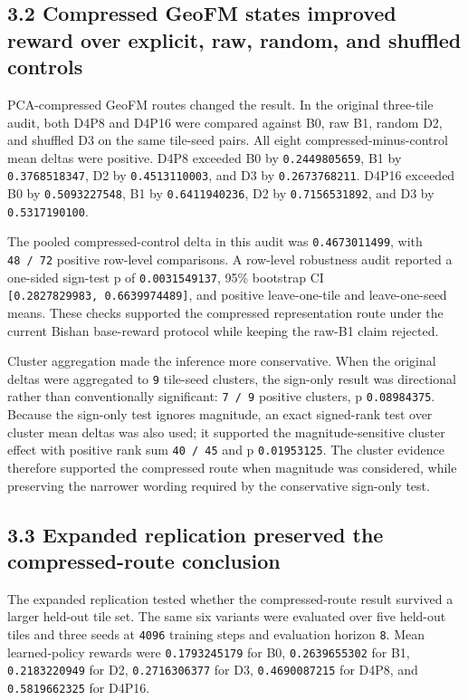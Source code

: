 \documentclass[
  11pt,
  a4paper,
]{article}
\begin{document}
\subsection{3.2 Compressed GeoFM states improved reward over explicit,
raw, random, and shuffled
controls}\label{compressed-geofm-states-improved-reward-over-explicit-raw-random-and-shuffled-controls}

PCA-compressed GeoFM routes changed the result. In the original
three-tile audit, both D4P8 and D4P16 were compared against B0, raw B1,
random D2, and shuffled D3 on the same tile-seed pairs. All eight
compressed-minus-control mean deltas were positive. D4P8 exceeded B0 by
\texttt{0.2449805659}, B1 by \texttt{0.3768518347}, D2 by
\texttt{0.4513110003}, and D3 by \texttt{0.2673768211}. D4P16 exceeded
B0 by \texttt{0.5093227548}, B1 by \texttt{0.6411940236}, D2 by
\texttt{0.7156531892}, and D3 by \texttt{0.5317190100}.

The pooled compressed-control delta in this audit was
\texttt{0.4673011499}, with \texttt{48\ /\ 72} positive row-level
comparisons. A row-level robustness audit reported a one-sided sign-test
p of \texttt{0.0031549137}, 95\% bootstrap CI
\texttt{{[}0.2827829983,\ 0.6639974489{]}}, and positive leave-one-tile
and leave-one-seed means. These checks supported the compressed
representation route under the current Bishan base-reward protocol while
keeping the raw-B1 claim rejected.

Cluster aggregation made the inference more conservative. When the
original deltas were aggregated to \texttt{9} tile-seed clusters, the
sign-only result was directional rather than conventionally significant:
\texttt{7\ /\ 9} positive clusters, p \texttt{0.08984375}. Because the
sign-only test ignores magnitude, an exact signed-rank test over cluster
mean deltas was also used; it supported the magnitude-sensitive cluster
effect with positive rank sum \texttt{40\ /\ 45} and p
\texttt{0.01953125}. The cluster evidence therefore supported the
compressed route when magnitude was considered, while preserving the
narrower wording required by the conservative sign-only test.

\subsection{3.3 Expanded replication preserved the compressed-route
conclusion}\label{expanded-replication-preserved-the-compressed-route-conclusion}

The expanded replication tested whether the compressed-route result
survived a larger held-out tile set. The same six variants were
evaluated over five held-out tiles and three seeds at \texttt{4096}
training steps and evaluation horizon \texttt{8}. Mean learned-policy
rewards were \texttt{0.1793245179} for B0, \texttt{0.2639655302} for B1,
\texttt{0.2183220949} for D2, \texttt{0.2716306377} for D3,
\texttt{0.4690087215} for D4P8, and \texttt{0.5819662325} for D4P16.
\end{document}

